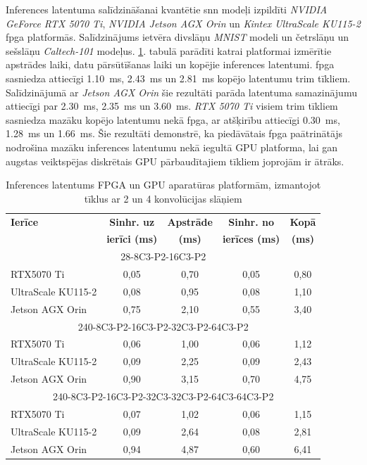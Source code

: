Inferences latentuma salīdzināšanai kvantētie \Gls{snn} modeļi izpildīti \textit{NVIDIA GeForce RTX 5070 Ti}, \textit{NVIDIA Jetson AGX Orin} un \textit{Kintex UltraScale KU115-2} \Gls{fpga} platformās. Salīdzinājums ietvēra divslāņu \textit{MNIST} modeli un četrslāņu un sešslāņu \textit{Caltech-101} modeļus. \ref{tab:execution_time}. tabulā parādīti katrai platformai izmērītie apstrādes laiki, datu pārsūtīšanas laiki un kopējie inferences latentumi. \Gls{fpga} sasniedza attiecīgi \qty{1.10}{\milli\second}, \qty{2.43}{\milli\second} un \qty{2.81}{\milli\second} kopējo latentumu trim tīkliem. Salīdzinājumā ar \textit{Jetson AGX Orin} šie rezultāti parāda latentuma samazinājumu attiecīgi par \qty{2.30}{\milli\second}, \qty{2.35}{\milli\second} un \qty{3.60}{\milli\second}. \textit{RTX 5070 Ti} visiem trim tīkliem sasniedza mazāku kopējo latentumu nekā \Gls{fpga}, ar atšķirību attiecīgi \qty{0.30}{\milli\second}, \qty{1.28}{\milli\second} un \qty{1.66}{\milli\second}. Šie rezultāti demonstrē, ka piedāvātais \Gls{fpga} paātrinātājs nodrošina mazāku inferences latentumu nekā iegultā GPU platforma, lai gan augstas veiktspējas diskrētais GPU pārbaudītajiem tīkliem joprojām ir ātrāks.

\begin{table}[t]
\centering
\caption{Inferences latentums FPGA un GPU aparatūras platformām, izmantojot tīklus ar 2 un 4 konvolūcijas slāņiem
}
\label{tab:execution_time}
\begin{tabular}{lcccc}
\toprule
\textbf{Ierīce} & \textbf{Sinhr. uz} & \textbf{Apstrāde} & \textbf{Sinhr. no} & \textbf{Kopā} \\
 & \textbf{ierīci (ms)} & \textbf{(ms)} & \textbf{ierīces (ms)} & \textbf{(ms)} \\
\midrule
\multicolumn{5}{c}{28\texttimes 28-8C3-P2-16C3-P2} \\
\midrule
RTX5070 Ti & 0{,}05 & 0{,}70 & 0{,}05 & 0{,}80 \\
UltraScale KU115-2 & 0{,}08 & 0{,}95 & 0{,}08 & 1{,}10 \\
Jetson AGX Orin & 0{,}75 & 2{,}10 & 0{,}55 & 3{,}40 \\
\midrule
\multicolumn{5}{c}{240\texttimes 180-8C3-P2-16C3-P2-32C3-P2-64C3-P2} \\
\midrule
RTX5070 Ti & 0{,}06 & 1{,}00 & 0{,}06 & 1{,}12 \\
UltraScale KU115-2 & 0{,}09 & 2{,}25 & 0{,}09 & 2{,}43 \\
Jetson AGX Orin & 0{,}90 & 3{,}15 & 0{,}70 & 4{,}75 \\
\midrule
\multicolumn{5}{c}{240\texttimes 180-8C3-P2-16C3-P2-32C3-32C3-P2-64C3-64C3-P2} \\
\midrule
RTX5070 Ti & 0{,}07 & 1{,}02 & 0{,}06 & 1{,}15 \\
UltraScale KU115-2 & 0{,}09 & 2{,}64 & 0{,}08 & 2{,}81 \\
Jetson AGX Orin & 0{,}94 & 4{,}87 & 0{,}60 & 6{,}41 \\
\bottomrule
\end{tabular}
\end{table}

